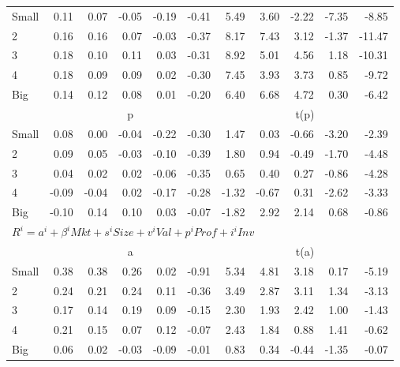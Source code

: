 \begin{table}[!ht]
\begin{tabular}{lrrrrrrrrrr}
    \\
      \cmidrule(r){2-6} \cmidrule(r){7-11}

    Small   & 0.11  & 0.07  & -0.05  & -0.19  & -0.41  & 5.49  & 3.60  & -2.22  & -7.35  & -8.85  \\
         2  & 0.16  & 0.16  & 0.07  & -0.03  & -0.37  & 8.17  & 7.43  & 3.12  & -1.37  & -11.47  \\
         3  & 0.18  & 0.10  & 0.11  & 0.03  & -0.31  & 8.92  & 5.01  & 4.56  & 1.18  & -10.31  \\
         4  & 0.18  & 0.09  & 0.09  & 0.02  & -0.30  & 7.45  & 3.93  & 3.73  & 0.85  & -9.72  \\
    Big     & 0.14  & 0.12  & 0.08  & 0.01  & -0.20  & 6.40  & 6.68  & 4.72  & 0.30  & -6.42  \\

  
    
      & \multicolumn{5}{c}{p} & \multicolumn{5}{c}{t(p)}
    
    \\
      \cmidrule(r){2-6} \cmidrule(r){7-11}

    Small   & 0.08  & 0.00  & -0.04  & -0.22  & -0.30  & 1.47  & 0.03  & -0.66  & -3.20  & -2.39  \\
         2  & 0.09  & 0.05  & -0.03  & -0.10  & -0.39  & 1.80  & 0.94  & -0.49  & -1.70  & -4.48  \\
         3  & 0.04  & 0.02  & 0.02  & -0.06  & -0.35  & 0.65  & 0.40  & 0.27  & -0.86  & -4.28  \\
         4  & -0.09  & -0.04  & 0.02  & -0.17  & -0.28  & -1.32  & -0.67  & 0.31  & -2.62  & -3.33  \\
    Big     & -0.10  & 0.14  & 0.10  & 0.03  & -0.07  & -1.82  & 2.92  & 2.14  & 0.68  & -0.86  \\

  \midrule
  \multicolumn{11}{l}{$R^i=a^i+\beta^iMkt+s^iSize+v^iVal+p^iProf+i^iInv$} \\

  
    
      & \multicolumn{5}{c}{a} & \multicolumn{5}{c}{t(a)}
    
    \\
      \cmidrule(r){2-6} \cmidrule(r){7-11}

    Small   & 0.38  & 0.38  & 0.26  & 0.02  & -0.91  & 5.34  & 4.81  & 3.18  & 0.17  & -5.19  \\
         2  & 0.24  & 0.21  & 0.24  & 0.11  & -0.36  & 3.49  & 2.87  & 3.11  & 1.34  & -3.13  \\
         3  & 0.17  & 0.14  & 0.19  & 0.09  & -0.15  & 2.30  & 1.93  & 2.42  & 1.00  & -1.43  \\
         4  & 0.21  & 0.15  & 0.07  & 0.12  & -0.07  & 2.43  & 1.84  & 0.88  & 1.41  & -0.62  \\
    Big     & 0.06  & 0.02  & -0.03  & -0.09  & -0.01  & 0.83  & 0.34  & -0.44  & -1.35  & -0.07  \\


\end{tabular}
\end{table}
